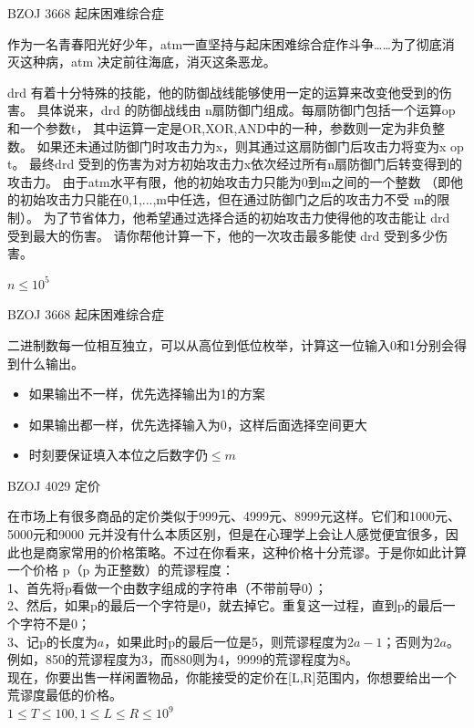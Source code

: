 \documentclass{beamer}
\begin{document}
\begin{frame}{BZOJ 3668 起床困难综合症}

    作为一名青春阳光好少年，atm一直坚持与起床困难综合症作斗争……为了彻底消灭这种病，atm 决定前往海底，消灭这条恶龙。
    
    drd 有着十分特殊的技能，他的防御战线能够使用一定的运算来改变他受到的伤害。
    具体说来，drd 的防御战线由 n扇防御门组成。每扇防御门包括一个运算op和一个参数t，
    其中运算一定是OR,XOR,AND中的一种，参数则一定为非负整数。
    如果还未通过防御门时攻击力为x，则其通过这扇防御门后攻击力将变为x op t。
    最终drd 受到的伤害为对方初始攻击力x依次经过所有n扇防御门后转变得到的攻击力。
    由于atm水平有限，他的初始攻击力只能为0到m之间的一个整数
    （即他的初始攻击力只能在0,1,...,m中任选，但在通过防御门之后的攻击力不受 m的限制）。
    为了节省体力，他希望通过选择合适的初始攻击力使得他的攻击能让 drd 受到最大的伤害。
    请你帮他计算一下，他的一次攻击最多能使 drd 受到多少伤害。

    $n\leq 10^5$
    
\end{frame}

\begin{frame}{BZOJ 3668 起床困难综合症}

    二进制数每一位相互独立，可以从高位到低位枚举，计算这一位输入0和1分别会得到什么输出。

    \begin{itemize}
        \item 如果输出不一样，优先选择输出为1的方案
        \item 如果输出都一样，优先选择输入为0，这样后面选择空间更大
        \item 时刻要保证填入本位之后数字仍$\leq m$
    \end{itemize}
    
\end{frame}

\begin{frame}{BZOJ 4029 定价}

    在市场上有很多商品的定价类似于999元、4999元、8999元这样。它们和1000元、5000元和9000 元并没有什么本质区别，但是在心理学上会让人感觉便宜很多，因此也是商家常用的价格策略。不过在你看来，这种价格十分荒谬。于是你如此计算一个价格 p（p 为正整数）的荒谬程度：\\
    1、首先将p看做一个由数字组成的字符串（不带前导0）；\\
    2、然后，如果p的最后一个字符是0，就去掉它。重复这一过程，直到p的最后一个字符不是0；\\
    3、记p的长度为$a$，如果此时p的最后一位是5，则荒谬程度为$2a-1$；否则为$2a$。\\
    例如，850的荒谬程度为3，而880则为4，9999的荒谬程度为8。\\
    现在，你要出售一样闲置物品，你能接受的定价在[L,R]范围内，你想要给出一个荒谬度最低的价格。\\
    $1\leq T\leq 100,1\leq L\leq R\leq 10^9$
    
\end{frame}
\end{document}
